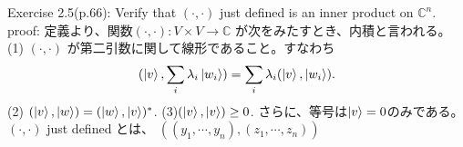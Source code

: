 {\Large Exercise 2.5(p.66):}
Verify that $(\cdot, \cdot)$ just defined is an inner product on $\mathbb{C}^n$.
\newline
\vspace{0.1in}
{\large proof:}
 定義より、関数$(\cdot, \cdot):V \times V \to \mathbb{C}$
が次をみたすとき、内積と言われる。
\newline
(1) $(\cdot, \cdot)$ が第二引数に関して線形であること。すなわち
\newline
\begin{eqnarray*}
 (\ket{v}, \sum_{i} \lambda_i \ket{w_i})
 = \sum_{i} \lambda_i (\ket{v}, \ket{w_i}).
\end{eqnarray*}
\newline
(2)
$(\ket{v}, \ket{w}) = (\ket{w}, \ket{v})^*$.
\newline
(3)$(\ket{v}, \ket{v}) \geq 0$.
さらに、等号は$\ket{v} = 0$のみである。
\newline
$(\cdot, \cdot)$ just defined とは、
$((y_1, \cdots, y_n), (z_1, \cdots, z_n)) $ 
